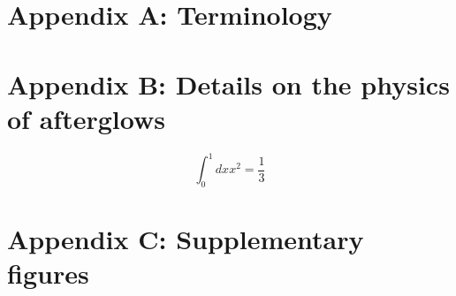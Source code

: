 \section*{Appendix A: Terminology}

\section*{Appendix B: Details on the physics of afterglows}

$$ \int_0^1 dx x^2 = \frac{1}{3} $$

\section*{Appendix C: Supplementary figures}